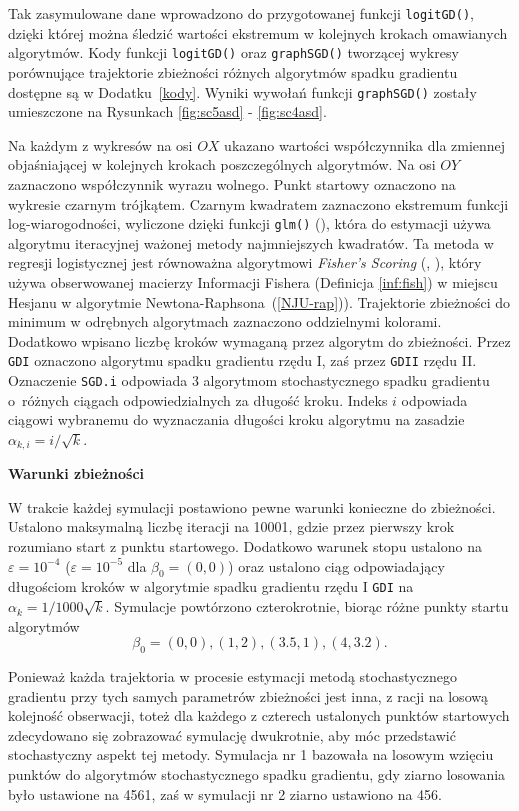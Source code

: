 Tak zasymulowane dane wprowadzono do przygotowanej funkcji \texttt{logitGD()}, dzięki której można śledzić wartości ekstremum w kolejnych krokach omawianych algorytmów. Kody funkcji \texttt{logitGD()} oraz \texttt{graphSGD()} tworzącej wykresy porównujące trajektorie zbieżności różnych algorytmów spadku gradientu  dostępne są w Dodatku~\ref{kody}. Wyniki wywołań funkcji \texttt{graphSGD()} zostały umieszczone na Rysunkach \ref{fig:sc5asd} - \ref{fig:sc4asd}.

Na każdym z wykresów na osi $OX$ ukazano wartości współczynnika dla zmiennej objaśniającej w kolejnych krokach poszczególnych algorytmów. Na osi $OY$ zaznaczono współczynnik wyrazu wolnego. Punkt startowy oznaczono na wykresie czarnym trójkątem. Czarnym kwadratem zaznaczono ekstremum funkcji log-wiarogodności, wyliczone dzięki funkcji \texttt{glm()} (\cite{glmglm}), która do estymacji używa algorytmu iteracyjnej ważonej metody najmniejszych kwadratów. Ta metoda w regresji logistycznej jest równoważna algorytmowi \textit{Fisher's Scoring} (\cite{scoring1}, \cite{scoring2}), który używa obserwowanej macierzy Informacji Fishera (Definicja \ref{inf:fish}) w miejscu Hesjanu w algorytmie Newtona-Raphsona~(\ref{NJU-rap})). Trajektorie zbieżności do minimum w odrębnych algorytmach zaznaczono oddzielnymi kolorami. Dodatkowo wpisano liczbę kroków wymaganą przez algorytm do zbieżności. Przez \texttt{GDI} oznaczono algorytmu spadku gradientu rzędu I, zaś przez \texttt{GDII} rzędu II. Oznaczenie \texttt{SGD.i} odpowiada 3 algorytmom stochastycznego spadku gradientu o~różnych ciągach odpowiedzialnych za długość kroku. Indeks $i$ odpowiada ciągowi wybranemu do wyznaczania długości kroku algorytmu na zasadzie $\alpha_{k,i} = i/\sqrt{k}$.

\textbf{Warunki zbieżności}

W trakcie każdej symulacji postawiono pewne warunki konieczne do zbieżności. Ustalono maksymalną liczbę iteracji na 10001, gdzie przez pierwszy krok rozumiano start z punktu startowego. Dodatkowo warunek stopu ustalono na $\varepsilon=10^{-4}$ ($\varepsilon=10^{-5}$ dla $\beta_0 = (0,0)$) oraz ustalono ciąg odpowiadający długościom kroków w algorytmie spadku gradientu rzędu I \texttt{GDI} na $\alpha_{k} = 1/1000\sqrt{k}$. Symulacje powtórzono czterokrotnie, biorąc różne punkty startu algorytmów $$\beta_0 = (0,0), (1,2), (3.5,1), (4,3.2).$$

Ponieważ każda trajektoria w procesie estymacji metodą stochastycznego gradientu przy tych samych parametrów zbieżności jest inna, z racji na losową kolejność obserwacji, toteż dla każdego z czterech ustalonych punktów startowych zdecydowano się zobrazować symulację dwukrotnie, aby móc przedstawić stochastyczny aspekt tej metody. Symulacja nr 1 bazowała na losowym wzięciu punktów do algorytmów stochastycznego spadku gradientu, gdy ziarno losowania było ustawione na 4561, zaś w symulacji nr 2 ziarno ustawiono na 456.

